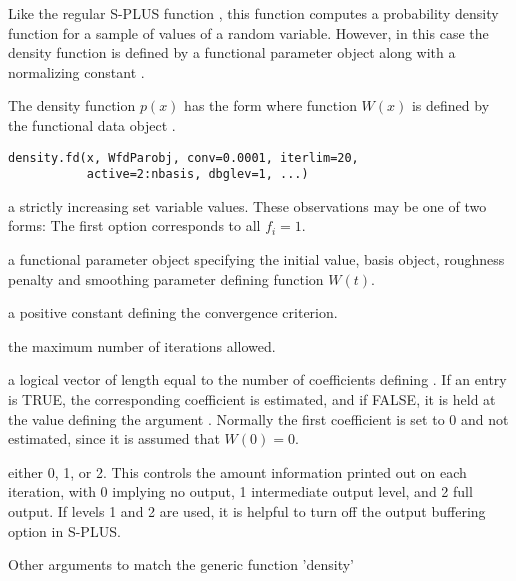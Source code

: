 \documentclass{article}
\begin{document}
\begin{Description}\relax
Like the regular S-PLUS function , this function
computes a probability density function for a sample of values of a
random variable.  However, in this case the density function is defined
by a functional parameter object  along with a normalizing
constant .

The density function $p(x)$ has the form
where function $W(x)$ is defined by the functional data object
.
\end{Description}
\begin{Usage}
\begin{verbatim}
density.fd(x, WfdParobj, conv=0.0001, iterlim=20,
           active=2:nbasis, dbglev=1, ...)
\end{verbatim}
\end{Usage}
\begin{Arguments}
\begin{ldescription}
\item[\code{x}] a strictly increasing set variable values.
These observations may be one of two forms:
The first option corresponds to all $f_i = 1$.

\item[\code{WfdParobj}] a functional parameter object specifying the initial
value, basis object, roughness penalty and smoothing
parameter defining function $W(t).$

\item[\code{conv}] a positive constant defining the convergence criterion.

\item[\code{iterlim}] the maximum number of iterations allowed.

\item[\code{active}] a logical vector of length equal to the number of coefficients
defining . If an entry is TRUE, the corresponding
coefficient is estimated, and if FALSE, it is held at the value defining the
argument .  Normally the first coefficient is set to 0
and not estimated, since it is assumed that $W(0) = 0$.

\item[\code{dbglev}] either 0, 1, or 2.  This controls the amount information printed out on
each iteration, with 0 implying no output, 1 intermediate output level,
and 2 full output.  If levels 1 and 2 are used, it is helpful to
turn off the output buffering option in S-PLUS.

\item[\code{...}] Other arguments to match the generic function 'density'
\end{ldescription}
\end{Arguments}
\end{document}

